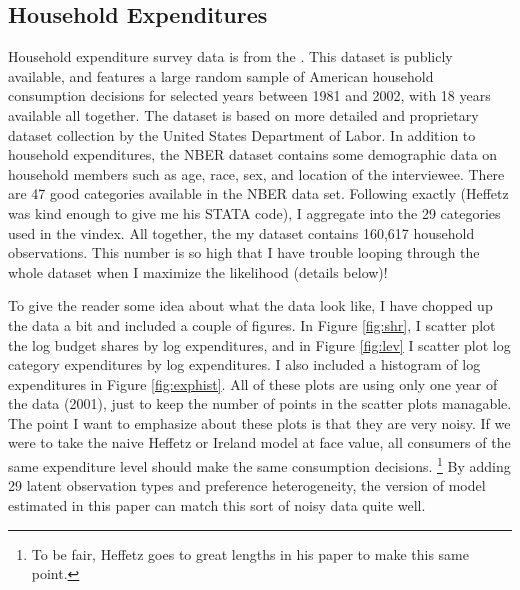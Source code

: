\documentclass[12pt]{article}
\begin{document}
\subsection{Household Expenditures}
Household expenditure survey data is from the \citet{NBERCEX2011}.    
This dataset is publicly available, and features a large random sample of American household consumption decisions for selected years between 1981 and 2002, with 18 years available all together.  
The dataset is based on more detailed and proprietary dataset collection by the United States Department of Labor. 
In addition to household expenditures, the NBER dataset contains some demographic data on household members such as age, race, sex, and location of the interviewee.  
There are 47 good categories available in the NBER data set.
Following \citet{Heffetz2011} exactly (Heffetz was kind enough to give me his STATA code), I aggregate into the 29 categories used in the vindex.
All together, the my dataset contains 160,617 household observations.
This number is so high that I have trouble looping through the whole dataset when I maximize the likelihood (details below)!

To give the reader some idea about what the data look like, I have chopped up the data a bit and included a couple of figures.  
In Figure \ref{fig:shr}, I scatter plot the log budget shares by log expenditures, and in Figure \ref{fig:lev} I scatter plot log category expenditures by log expenditures.  
I also included a histogram of log expenditures in Figure \ref{fig:exphist}.  
All of these plots are using only one year of the data (2001), just to keep the number of points in the scatter plots managable. 
The point I want to emphasize about these plots is that they are very noisy.
If we were to take the naive Heffetz or Ireland model at face value, all consumers of the same expenditure level should make the same consumption decisions.
\footnote{To be fair, Heffetz goes to great lengths in his paper to make this same point.}
By adding 29 latent observation types and preference heterogeneity, the version of model estimated in this paper can match this sort of noisy data quite well.
\end{document}
